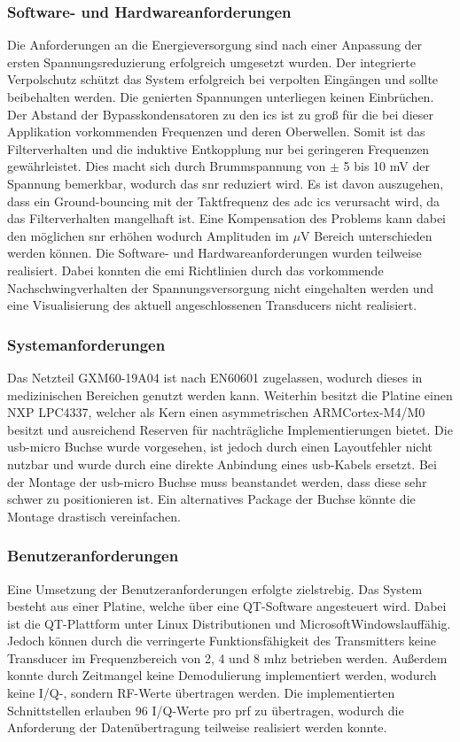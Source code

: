 \subsubsection*{Software- und Hardwareanforderungen}
Die Anforderungen an die Energieversorgung sind nach einer Anpassung der ersten Spannungsreduzierung erfolgreich umgesetzt wurden. Der integrierte Verpolschutz schützt das System erfolgreich bei verpolten Eingängen und sollte beibehalten werden. Die genierten Spannungen unterliegen keinen Einbrüchen. Der Abstand der Bypasskondensatoren zu den \ac{ic}s ist zu groß für die bei dieser Applikation vorkommenden Frequenzen und deren Oberwellen. Somit ist das Filterverhalten und die induktive Entkopplung nur bei geringeren Frequenzen gewährleistet. Dies macht sich durch Brummspannung von $\pm$ 5 bis 10 mV der Spannung bemerkbar, wodurch das \ac{snr} reduziert wird. Es ist davon auszugehen, dass ein Ground-bouncing mit der Taktfrequenz des \ac{adc} \ac{ic}s verursacht wird, da das Filterverhalten mangelhaft ist. Eine Kompensation des Problems kann dabei den möglichen \ac{snr} erhöhen wodurch Amplituden im $\mu$V Bereich unterschieden werden können. Die Software- und Hardwareanforderungen wurden teilweise realisiert. Dabei konnten die \ac{emi} Richtlinien durch das vorkommende Nachschwingverhalten der Spannungsversorgung nicht eingehalten werden und eine Visualisierung des aktuell angeschlossenen Transducers nicht realisiert. 
\subsubsection*{Systemanforderungen}
Das Netzteil GXM60-19A04 ist nach EN60601 zugelassen, wodurch dieses in medizinischen Bereichen genutzt werden kann. Weiterhin besitzt die Platine einen NXP LPC4337, welcher als Kern einen asymmetrischen ARM\SymbReg Cortex\SymbReg-M4/M0 besitzt und ausreichend Reserven für nachträgliche Implementierungen bietet. Die \ac{usb}-micro Buchse wurde vorgesehen, ist jedoch durch einen Layoutfehler nicht nutzbar und wurde durch eine direkte Anbindung eines \ac{usb}-Kabels ersetzt. Bei der Montage der \ac{usb}-micro Buchse muss beanstandet werden, dass diese sehr schwer zu positionieren ist. Ein alternatives Package der Buchse könnte die Montage drastisch vereinfachen.
\subsubsection*{Benutzeranforderungen}
Eine Umsetzung der Benutzeranforderungen erfolgte zielstrebig. Das System besteht aus einer Platine, welche über eine QT-Software angesteuert wird. Dabei ist die QT-Plattform unter Linux Distributionen und Microsoft\SymbC Windows\SymbReg lauffähig. Jedoch können durch die verringerte Funktionsfähigkeit des Transmitters keine Transducer im Frequenzbereich von 2, 4 und 8 \ac{mhz} betrieben werden. Außerdem konnte durch Zeitmangel keine Demodulierung implementiert werden, wodurch keine I/Q-, sondern RF-Werte übertragen werden. Die implementierten Schnittstellen erlauben 96 I/Q-Werte pro \ac{prf} zu übertragen, wodurch die Anforderung der Datenübertragung teilweise realisiert werden konnte.


